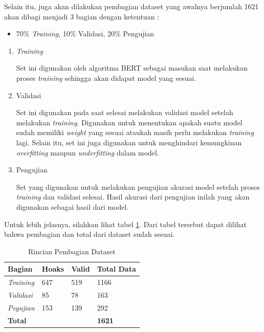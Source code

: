 Selain itu, juga akan dilakukan pembagian dataset yang awalnya berjumlah 1621 akan dibagi menjadi 3 bagian dengan ketentuan :

\begin{itemize}
    \item 70\% \textit{Training}, 10\% Validasi, 20\% Pengujian
\end{itemize}

\begin{enumerate}
    \item \textit{Training}

          Set ini digunakan oleh algoritma BERT sebagai masukan saat melakukan proses \textit{training} sehingga akan didapat model yang sesuai.

    \item Validasi

          Set ini digunakan pada saat selesai melakukan validasi model setelah melakukan \textit{training}. Digunakan untuk menentukan apakah suatu model sudah memiliki \textit{weight} yang sesuai ataukah masih perlu melakukan \textit{training} lagi. Selain itu, set ini juga digunakan untuk menghindari kemungkinan \textit{overfitting} maupun \textit{underfitting} dalam model.

    \item Pengujian

          Set yang digunakan untuk melakukan pengujian akurasi model setelah proses \textit{training} dan validasi selesai. Hasil akurasi dari pengujian inilah yang akan digunakan sebagai hasil dari model.

\end{enumerate}

Untuk lebih jelasnya, silahkan lihat tabel \ref{tab:dataset_section}. Dari tabel tersebut dapat dilihat bahwa pembagian dan total dari dataset sudah sesuai.

\begin{table}
    \caption{Rincian Pembagian Dataset}
    \label{tab:dataset_section}
    \centering
    \begin{tabular}{ | l | l | l | l | }
        \hline
        \textbf{Bagian}                      & \textbf{Hoaks} & \textbf{Valid} & \textbf{Total Data} \\ \hline
        \textit{Training}                    & 647            & 519            & 1166                \\ \hline
        \textit{Validasi}                    & 85             & 78             & 163                 \\ \hline
        \textit{Pegujian}                    & 153            & 139            & 292                 \\ \hline
        \multicolumn{3}{|l|}{\textbf{Total}} & \textbf{1621}                                         \\ \hline
    \end{tabular}
\end{table}

